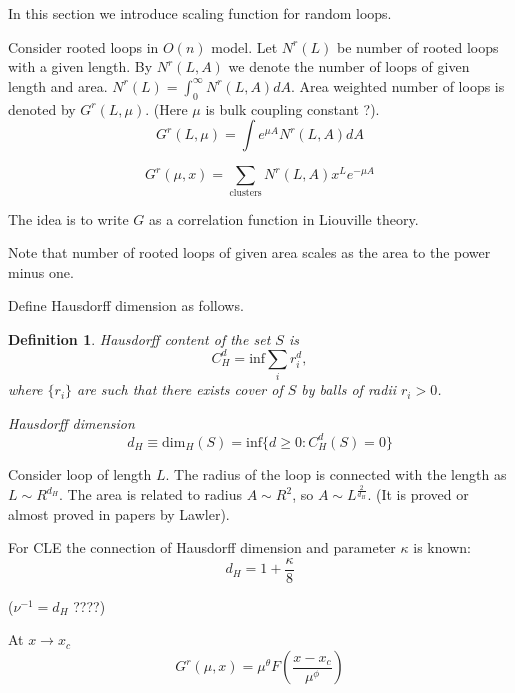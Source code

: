 \documentclass[12pt]{article}
\newtheorem{definition}{Definition}
\begin{document}
In this section we introduce scaling function for random loops. 

Consider rooted loops in $O(n)$ model. Let $N^r(L)$ be number of
rooted loops with a given length.  By $N^r(L,A)$ we denote the number
of loops of given length and area. $N^r(L)=\int_0^{\infty} N^r(L,A)
dA$. Area weighted number of loops is denoted by $G^r(L,\mu)$. (Here
$\mu$ is bulk coupling constant ?).
\begin{equation}
  \label{eq:2}
  G^r(L,\mu)=\int e^{\mu A} N^r(L,A) dA
\end{equation}

\begin{equation}
  \label{eq:1}
  G^r (\mu,x) = \sum_{\mathrm{clusters}} N^r (L,A) x^L e^{-\mu A}
\end{equation}

The idea is to write $G$ as a correlation function in Liouville
theory.

Note that number of rooted loops of given area scales as the area to
the power minus one. 

Define Hausdorff dimension as follows.
\begin{definition}
  {\it Hausdorff content} of the set $S$ is
  \begin{equation}
    \label{eq:3}
    C^d_H = \mathrm{inf} \sum_i r_i^d,
  \end{equation}
  where $\{r_i\}$ are such that there exists cover of $S$ by balls of
  radii $r_i>0$. 

  {\it Hausdorff dimension}
  \begin{equation}
    \label{eq:4}
    d_H\equiv\mathrm{dim}_H(S) = \mathrm{inf}\{ d\geq 0: C^d_H(S)=0\}
  \end{equation}
\end{definition}

Consider loop of length $L$. The radius of the loop is connected with
the length as $L\sim R^{d_H}$. The area is related to radius $A\sim
R^2$, so $A\sim L^{\frac{2}{d_H}}$.
(It is proved or almost proved in papers by Lawler).

For CLE the connection of Hausdorff dimension and parameter $\kappa$
is known:
\begin{equation}
  \label{eq:5}
  d_H=1+\frac{\kappa}{8}
\end{equation}

($\nu^{-1}=d_H$ ????)


At $x\to x_c$
\begin{equation}
  \label{eq:6}
  G^r(\mu,x)= \mu^{\theta} F\left(\frac{x-x_c}{\mu^{\phi}}\right)
\end{equation}
\end{document}
